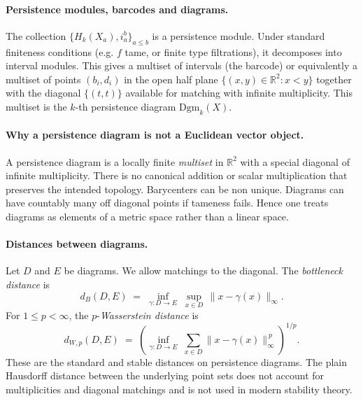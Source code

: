 \paragraph{Persistence modules, barcodes and diagrams.}
The collection $\{H_k(X_a), i_{a}^{b}\}_{a\le b}$ is a persistence module. Under standard finiteness conditions (e.g. $f$ tame, or finite type filtrations), it decomposes into interval modules. This gives a multiset of intervals (the barcode) or equivalently a multiset of points $(b_i,d_i)$ in the open half plane $\{(x,y)\in\mathbb{R}^2: x<y\}$ together with the diagonal $\{(t,t)\}$ available for matching with infinite multiplicity. This multiset is the $k$-th persistence diagram $\mathrm{Dgm}_k(X)$.

\paragraph{Why a persistence diagram is not a Euclidean vector object.}
A persistence diagram is a locally finite \emph{multiset} in $\mathbb{R}^2$ with a special diagonal of infinite multiplicity. There is no canonical addition or scalar multiplication that preserves the intended topology. Barycenters can be non unique. Diagrams can have countably many off diagonal points if tameness fails. Hence one treats diagrams as elements of a metric space rather than a linear space.

\paragraph{Distances between diagrams.}
Let $D$ and $E$ be diagrams. We allow matchings to the diagonal. The \emph{bottleneck distance} is
\begin{equation}
d_B(D,E) \;=\; \inf_{\gamma:D\to E} \; \sup_{x\in D} \, \lVert x - \gamma(x) \rVert_{\infty}.
\end{equation}
For $1\le p<\infty$, the $p$-\emph{Wasserstein distance} is
\begin{equation}
d_{W,p}(D,E) \;=\; \left( \inf_{\gamma:D\to E} \; \sum_{x\in D} \lVert x - \gamma(x) \rVert_{\infty}^{\,p} \right)^{1/p}.
\end{equation}
These are the standard and stable distances on persistence diagrams. The plain Hausdorff distance between the underlying point sets does not account for multiplicities and diagonal matchings and is not used in modern stability theory.

